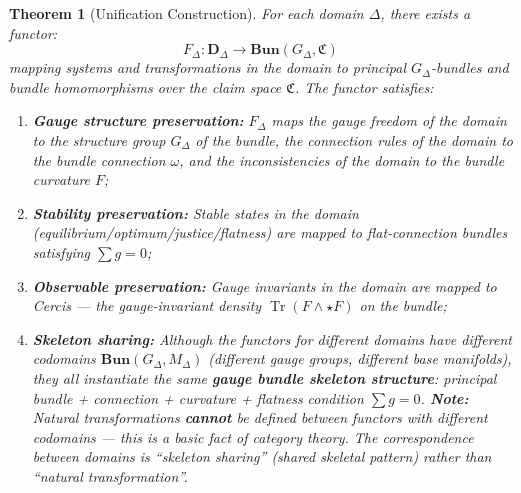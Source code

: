 \documentclass[12pt,a4paper]{article}
\theoremstyle{plain}
\newtheorem{theorem}{Theorem}[section]
\theoremstyle{definition}
\newcommand{\curv}{F}
\newcommand{\conn}{\omega}
\newcommand{\BundleCat}{\mathbf{Bun}}
\newcommand{\ClaimSpace}{\mathfrak{C}}
\DeclareMathOperator{\Tr}{Tr}
\begin{document}
\begin{theorem}[Unification Construction]
For each domain $\Delta$, there exists a functor:
\begin{equation}
    F_\Delta: \mathbf{D}_\Delta \longrightarrow \BundleCat(G_\Delta, \ClaimSpace)
\end{equation}
mapping systems and transformations in the domain to principal $G_\Delta$-bundles and bundle homomorphisms over the claim space $\ClaimSpace$.
The functor satisfies:

\begin{enumerate}[label=(\roman*)]
    \item \textbf{Gauge structure preservation:} $F_\Delta$ maps the gauge freedom of the domain to the structure group $G_\Delta$ of the bundle,
    the connection rules of the domain to the bundle connection $\conn$, and the inconsistencies of the domain to the bundle curvature $\curv$;
    \item \textbf{Stability preservation:} Stable states in the domain (equilibrium/optimum/justice/flatness) are mapped to flat-connection bundles satisfying
    $\sum g = 0$;
    \item \textbf{Observable preservation:} Gauge invariants in the domain are mapped to Cercis — the gauge-invariant density
    $\Tr(\curv \wedge \star \curv)$ on the bundle;
    \item \textbf{Skeleton sharing:} Although the functors for different domains have different codomains $\BundleCat(G_\Delta, M_\Delta)$
    (different gauge groups, different base manifolds), they all instantiate the same \textbf{gauge bundle skeleton structure}: principal bundle + connection + curvature + flatness condition $\sum g = 0$.
    \textbf{Note:} Natural transformations \textbf{cannot} be defined between functors with different codomains — this is a basic fact of category theory.
    The correspondence between domains is ``skeleton sharing'' (shared skeletal pattern) rather than ``natural transformation''.
\end{enumerate}
\end{theorem}
\end{document}

